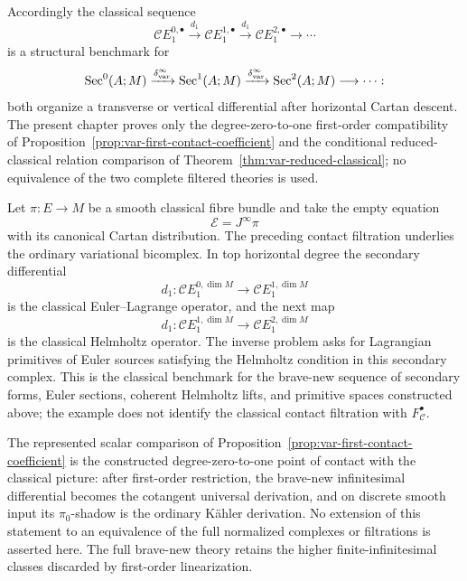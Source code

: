 Accordingly the classical sequence
\[
    \mathscr C E_1^{0,\bullet}
    \xrightarrow{d_1}
    \mathscr C E_1^{1,\bullet}
    \xrightarrow{d_1}
    \mathscr C E_1^{2,\bullet}
    \longrightarrow\cdots
\]
is a structural benchmark for
\[
    \operatorname{Sec}^0(A;M)
    \xrightarrow{\delta^\infty_{\mathrm{var}}}
    \operatorname{Sec}^1(A;M)
    \xrightarrow{\delta^\infty_{\mathrm{var}}}
    \operatorname{Sec}^2(A;M)
    \longrightarrow\cdots:
\]
both organize a transverse or vertical differential after horizontal Cartan descent.  The present chapter proves only the degree-zero-to-one first-order compatibility of Proposition~\ref{prop:var-first-contact-coefficient} and the conditional reduced-classical relation comparison of Theorem~\ref{thm:var-reduced-classical}; no equivalence of the two complete filtered theories is used.

\begin{example}
\label{ex:var-classical-empty-equation}
Let \(\pi:E\to M\) be a smooth classical fibre bundle and take the empty equation
\[
    \mathscr E=J^\infty\pi
\]
with its canonical Cartan distribution.  The preceding contact filtration underlies the ordinary variational bicomplex.  In top horizontal degree the secondary differential
\[
    d_1:
    \mathscr C E_1^{0,\dim M}
    \longrightarrow
    \mathscr C E_1^{1,\dim M}
\]
is the classical Euler--Lagrange operator, and the next map
\[
    d_1:
    \mathscr C E_1^{1,\dim M}
    \longrightarrow
    \mathscr C E_1^{2,\dim M}
\]
is the classical Helmholtz operator.  The inverse problem asks for Lagrangian primitives of Euler sources satisfying the Helmholtz condition in this secondary complex.  This is the classical benchmark for the brave-new sequence of secondary forms, Euler sections, coherent Helmholtz lifts, and primitive spaces constructed above; the example does not identify the classical contact filtration with \(F_{\mathcal C}^\bullet\).
\end{example}

\begin{remark}
The represented scalar comparison of Proposition~\ref{prop:var-first-contact-coefficient} is the constructed degree-zero-to-one point of contact with the classical picture: after first-order restriction, the brave-new infinitesimal differential becomes the cotangent universal derivation, and on discrete smooth input its \(\pi_0\)-shadow is the ordinary K\"ahler derivation.  No extension of this statement to an equivalence of the full normalized complexes or filtrations is asserted here.  The full brave-new theory retains the higher finite-infinitesimal classes discarded by first-order linearization.
\end{remark}


